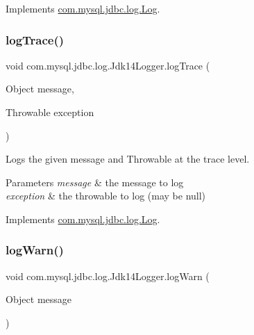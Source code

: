 Implements \mbox{\hyperlink{interfacecom_1_1mysql_1_1jdbc_1_1log_1_1_log_a8946382e4cf99819a43cdb3783fd0ee3}{com.\+mysql.\+jdbc.\+log.\+Log}}.

\mbox{\label{classcom_1_1mysql_1_1jdbc_1_1log_1_1_jdk14_logger_a9dd684e245ffdef5262bdd185171f773}} 
\subsubsection{\texorpdfstring{log\+Trace()}{logTrace()}\hspace{0.1cm}{\footnotesize\ttfamily [2/2]}}
{\footnotesize\ttfamily void com.\+mysql.\+jdbc.\+log.\+Jdk14\+Logger.\+log\+Trace (\begin{DoxyParamCaption}\item[{Object}]{message,  }\item[{Throwable}]{exception }\end{DoxyParamCaption})}

Logs the given message and Throwable at the \textquotesingle{}trace\textquotesingle{} level.


\begin{DoxyParams}{Parameters}
{\em message} & the message to log \\
\hline
{\em exception} & the throwable to log (may be null) \\
\hline
\end{DoxyParams}


Implements \mbox{\hyperlink{interfacecom_1_1mysql_1_1jdbc_1_1log_1_1_log_a99ab17ccd9795acda736a284d9e32024}{com.\+mysql.\+jdbc.\+log.\+Log}}.

\mbox{\label{classcom_1_1mysql_1_1jdbc_1_1log_1_1_jdk14_logger_aabfcbedefd9337d8f67f28a2c4a2a3ff}} 
\subsubsection{\texorpdfstring{log\+Warn()}{logWarn()}\hspace{0.1cm}{\footnotesize\ttfamily [1/2]}}
{\footnotesize\ttfamily void com.\+mysql.\+jdbc.\+log.\+Jdk14\+Logger.\+log\+Warn (\begin{DoxyParamCaption}\item[{Object}]{message }\end{DoxyParamCaption})}

